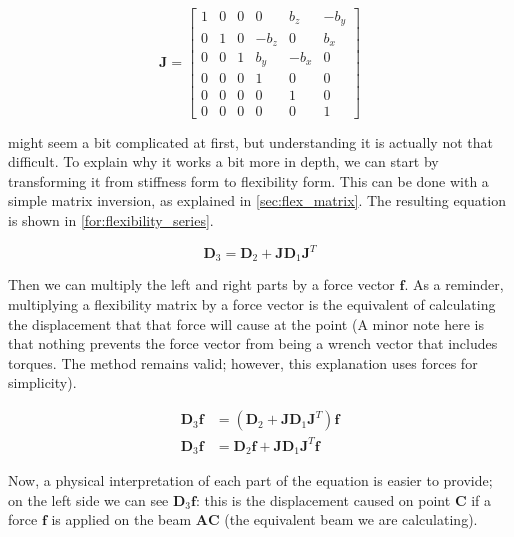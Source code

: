 \begin{equation}
\mathbf{J} = \begin{bmatrix}
1 & 0 & 0 & 0 & b_z & -b_y \\
0 & 1 & 0 & -b_z & 0 & b_x \\
0 & 0 & 1 & b_y & -b_x & 0 \\
0 & 0 & 0 & 1 & 0 & 0 \\
0 & 0 & 0 & 0 & 1 & 0 \\
0 & 0 & 0 & 0 & 0 & 1
\end{bmatrix}
\label{for:stiffness_jac}
\end{equation}


 might seem a bit complicated at first, but understanding it is actually
not that difficult. To explain why it works a bit more in depth, we can start by transforming it 
from stiffness form to flexibility form. This can be done with a simple matrix inversion, as explained
in \cref{sec:flex_matrix}. The resulting equation is shown in \cref{for:flexibility_series}.

\begin{equation}
\mathbf{D}_3 = \mathbf{D}_2 + \mathbf{J} \mathbf{D}_1 \mathbf{J}^T
\label{for:flexibility_series}
\end{equation}

\noindent
Then we can multiply the left and right parts by a force vector $\mathbf{f}$. As a reminder, multiplying
a flexibility matrix by a force vector is the equivalent of calculating the displacement that that force
will cause at the point (A minor note here is that nothing prevents the force vector from being a wrench 
vector that includes torques. The method remains valid; however, this explanation uses forces for simplicity).

\begin{equation}
\begin{split}
\mathbf{D}_3 \mathbf{f} &= (\mathbf{D}_2 + \mathbf{J} \mathbf{D}_1 \mathbf{J}^T) \mathbf{f}\\
\mathbf{D}_3 \mathbf{f} &= \mathbf{D}_2 \mathbf{f} + \mathbf{J} \mathbf{D}_1 \mathbf{J}^T \mathbf{f}
\end{split}
\label{for:flexibility_series_mul}
\end{equation}

\noindent
Now, a physical interpretation of each part of the equation is easier to provide; on the left side
we can see $\mathbf{D}_3 \mathbf{f}$: this is the displacement caused on point $\mathbf{C}$ if a force $\mathbf{f}$
is applied on the beam $\mathbf{AC}$ (the equivalent beam we are calculating).

